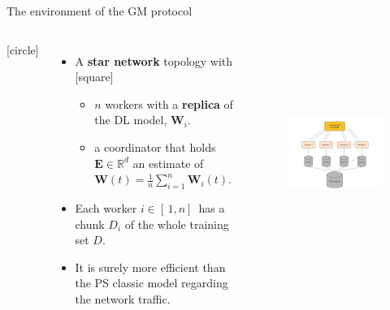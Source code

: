 \begin{frame}{The environment of the GM protocol}
    \begin{columns}
        [circle]
        \begin{itemize}
            \item{A \textbf{star network} topology with
            [square]
            \begin{itemize}
                \item $n$ workers with a \textbf{replica} of the DL model, $\pmb{W}_i$.
                \item a coordinator that holds $\pmb{E}\in\mathbb{R}^d$ an estimate of $\pmb{W}(t)=\frac{1}{n}\sum_{i=1}^n\pmb{W}_i(t)$.
            \end{itemize}}
            \vspace{0.1cm}
            \item{Each worker $i \in [\,1,n]\,$ has a chunk $D_i$ of the whole training set $D$.}
            \vspace{0.1cm}
            \item{It is surely more efficient than the PS classic model regarding the network traffic.}
        \end{itemize}
        \begin{figure}
            \includegraphics[width=8cm,height=6.5cm,center]{images/ml-fgm.png}\label{fig:ml-gm}
        \end{figure}
    \end{columns}
\end{frame}

